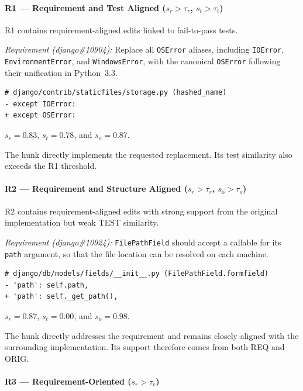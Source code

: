 \paragraph{R1 --- Requirement and Test Aligned \textnormal{($s_r>\tau_r$, $s_t>\tau_t$)}}

R1 contains requirement-aligned edits linked to fail-to-pass tests.

\smallskip
\noindent\textit{Requirement (django\#10904):}
Replace all \texttt{OSError} aliases, including \texttt{IOError}, \texttt{EnvironmentError}, and \texttt{WindowsError}, with the canonical \texttt{OSError} following their unification in Python~3.3.

\begin{lstlisting}
# django/contrib/staticfiles/storage.py (hashed_name)
- except IOError:
+ except OSError:
\end{lstlisting}

\noindent
$s_r=0.83$, $s_t=0.78$, and $s_o=0.87$.

The hunk directly implements the requested replacement. Its test similarity also exceeds the R1 threshold.

\paragraph{R2 --- Requirement and Structure Aligned \textnormal{($s_r>\tau_r$, $s_o>\tau_o$)}}

R2 contains requirement-aligned edits with strong support from the original implementation but weak TEST similarity.

\smallskip
\noindent\textit{Requirement (django\#10924):}
\texttt{FilePathField} should accept a callable for its \texttt{path} argument, so that the file location can be resolved on each machine.

\begin{lstlisting}
# django/db/models/fields/__init__.py (FilePathField.formfield)
- 'path': self.path,
+ 'path': self._get_path(),
\end{lstlisting}

\noindent
$s_r=0.87$, $s_t=0.00$, and $s_o=0.98$.

The hunk directly addresses the requirement and remains closely aligned with the surrounding implementation. Its support therefore comes from both REQ and ORIG.

\paragraph{R3 --- Requirement-Oriented \textnormal{($s_r>\tau_r$)}}

